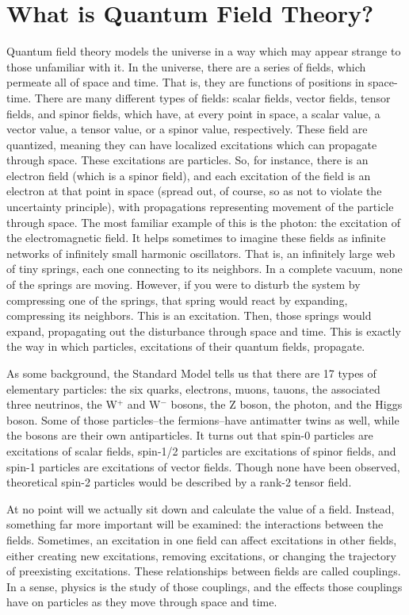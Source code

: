 \documentclass{report}
\begin{document}
\section{What is Quantum Field Theory?}
Quantum field theory models the universe in a way which may appear strange to those unfamiliar with it. In the universe, there are a series of fields, which permeate all of space and time. That is, they are functions of positions in space-time. There are many different types of fields: scalar fields, vector fields, tensor fields, and spinor fields, which have, at every point in space, a scalar value, a vector value, a tensor value, or a spinor value, respectively. These field are quantized, meaning they can have localized excitations which can propagate through space. These excitations are particles. So, for instance, there is an electron field (which is a spinor field), and each excitation of the field is an electron at that point in space (spread out, of course, so as not to violate the uncertainty principle), with propagations representing movement of the particle through space. The most familiar example of this is the photon: the excitation of the electromagnetic field. It helps sometimes to imagine these fields as infinite networks of infinitely small harmonic oscillators. That is, an infinitely large web of tiny springs, each one connecting to its neighbors. In a complete vacuum, none of the springs are moving. However, if you were to disturb the system by compressing one of the springs, that spring would react by expanding, compressing its neighbors. This is an excitation. Then, those springs would expand, propagating out the disturbance through space and time. This is exactly the way in which particles, excitations of their quantum fields, propagate.

As some background, the Standard Model tells us that there are 17 types of elementary particles: the six quarks, electrons, muons, tauons, the associated three neutrinos, the W$^+$ and W$^-$ bosons, the Z boson, the photon, and the Higgs boson. Some of those particles--the fermions--have antimatter twins as well, while the bosons are their own antiparticles. It turns out that spin-0 particles are excitations of scalar fields, spin-1/2 particles are excitations of spinor fields, and spin-1 particles are excitations of vector fields. Though none have been observed, theoretical spin-2 particles would be described by a rank-2 tensor field.

At no point will we actually sit down and calculate the value of a field. Instead, something far more important will be examined: the interactions between the fields. Sometimes, an excitation in one field can affect excitations in other fields, either creating new excitations, removing excitations, or changing the trajectory of preexisting excitations. These relationships between fields are called couplings. In a sense, physics is the study of those couplings, and the effects those couplings have on particles as they move through space and time.
\end{document}
